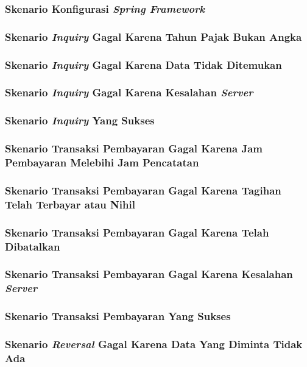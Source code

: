 \documentclass[pdftex,12pt, oneside]{article}
\begin{document}
\subsubsection{Skenario Konfigurasi \textit{Spring Framework}}
\subsubsection{Skenario \textit{Inquiry} Gagal Karena Tahun Pajak Bukan Angka}
\subsubsection{Skenario \textit{Inquiry} Gagal Karena Data Tidak Ditemukan}
\subsubsection{Skenario \textit{Inquiry} Gagal Karena Kesalahan \textit{Server}}
\subsubsection{Skenario \textit{Inquiry} Yang Sukses}
\subsubsection{Skenario Transaksi Pembayaran Gagal Karena Jam Pembayaran Melebihi Jam Pencatatan}
\subsubsection{Skenario Transaksi Pembayaran Gagal Karena Tagihan Telah Terbayar atau Nihil}
\subsubsection{Skenario Transaksi Pembayaran Gagal Karena Telah Dibatalkan}
\subsubsection{Skenario Transaksi Pembayaran Gagal Karena Kesalahan \textit{Server}}
\subsubsection{Skenario Transaksi Pembayaran Yang Sukses}
\subsubsection{Skenario \textit{Reversal} Gagal Karena Data Yang Diminta Tidak Ada}
\end{document}
